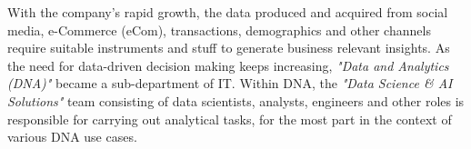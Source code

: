 With the company's rapid growth, the data produced and acquired from social media, e-Commerce (eCom), transactions, demographics and other channels require suitable instruments and stuff to generate business relevant insights. As the need for data-driven decision making keeps increasing, \textit{"Data and Analytics (DNA)"} became a sub-department of IT. Within DNA, the \textit{"Data Science \& AI Solutions"} team consisting of data scientists, analysts, engineers and other roles is responsible for carrying out analytical tasks, for the most part in the context of various DNA use cases.









